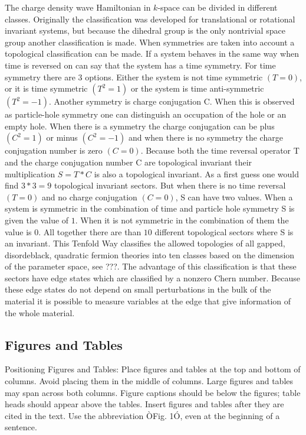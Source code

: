 \documentclass[letterpaper, 10 pt, conference]{ieeeconf}  %
\begin{document}
The charge density wave Hamiltonian in $k$-space can be divided in different
classes. Originally the classification was developed for translational or
rotational invariant systems, but because the dihedral group is the only
nontrivial space group another classification is made. When symmetries are taken
into account a topological classification can be made. If a system behaves in
the same way when time is reversed on can say that the system has a time
symmetry. For time symmetry there are 3 options. Either the system is not time
symmetric $(T=0)$, or it is time symmetric $(T^2=1)$ or the system is time
anti-symmetric  $(T^2=-1)$.  Another symmetry  is charge conjugation C. When
this is observed as particle-hole symmetry one can distinguish an occupation of
the hole or an empty hole. When there is a symmetry the  charge conjugation can
be plus $(C^2=1)$ or minus $(C^2=-1)$ and when there is no symmetry  the charge
conjugation number  is zero $(C=0)$.  Because both the time reversal operator T
and the charge conjugation number C are topological invariant their
multiplication $S=T * C $ is also a topological invariant. As a first guess one
would find $3 * 3 = 9 $ topological invariant sectors. But when there is no time
reversal $(T=0)$ and no charge conjugation $(C=0)$, S can have two values. When
a system is symmetric in the combination of time and particle hole symmetry S is
given the value of $1$. When it is not symmetric in the combination of them the
value is $0$. All together there are than $10$ different topological sectors
where S is an invariant. This Tenfold Way classifies the allowed topologies of
all gapped, disordeblack, quadratic fermion theories into ten classes based on the
dimension of the parameter space, see ???. The advantage of this classification is that
these sectors have edge states which are classified by a nonzero Chern number.
Because these edge states do not
depend on small perturbations in the bulk of the material it is possible to
measure variables at the edge that give information of the whole material.



\subsection{Figures and Tables}

Positioning Figures and Tables: Place figures and tables at the top and bottom of columns. Avoid placing them in the middle of columns. Large figures and tables may span across both columns. Figure captions should be below the figures; table heads should appear above the tables. Insert figures and tables after they are cited in the text. Use the abbreviation ÒFig. 1Ó, even at the beginning of a sentence.
\end{document}
